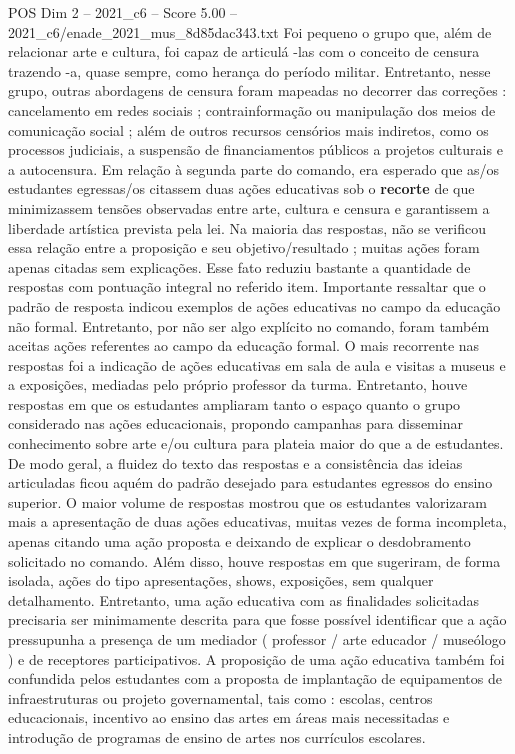 \begin{textsample}{POS Dim 2 – 2021\_c6 – Score 5.00 – 2021\_c6/enade\_2021\_mus\_8d85dac343.txt}
Foi pequeno o grupo que, além de relacionar arte e cultura, foi capaz de articulá -las com o conceito de censura trazendo -a, quase sempre, como herança do período militar.
Entretanto, nesse grupo, outras abordagens de censura foram mapeadas no decorrer das correções : cancelamento em redes sociais ; contrainformação ou manipulação dos meios de comunicação social ; além de outros recursos censórios mais indiretos, como os processos judiciais, a suspensão de financiamentos públicos a projetos culturais e a autocensura.
Em relação à segunda parte do comando, era esperado que as/os estudantes egressas/os citassem duas ações educativas sob o \textbf{recorte} de que minimizassem tensões observadas entre arte, cultura e censura e garantissem a liberdade artística prevista pela lei.
Na maioria das respostas, não se verificou essa relação entre a proposição e seu objetivo/resultado ; muitas ações foram apenas citadas sem explicações.
Esse fato reduziu bastante a quantidade de respostas com pontuação integral no referido item.
Importante ressaltar que o padrão de resposta indicou exemplos de ações educativas no campo da educação não formal.
Entretanto, por não ser algo explícito no comando, foram também aceitas ações referentes ao campo da educação formal.
O mais recorrente nas respostas foi a indicação de ações educativas em sala de aula e visitas a museus e a exposições, mediadas pelo próprio professor da turma.
Entretanto, houve respostas em que os estudantes ampliaram tanto o espaço quanto o grupo considerado nas ações educacionais, propondo campanhas para disseminar conhecimento sobre arte e/ou cultura para plateia maior do que a de estudantes.
De modo geral, a fluidez do texto das respostas e a consistência das ideias articuladas ficou aquém do padrão desejado para estudantes egressos do ensino superior.
O maior volume de respostas mostrou que os estudantes valorizaram mais a apresentação de duas ações educativas, muitas vezes de forma incompleta, apenas citando uma ação proposta e deixando de explicar o desdobramento solicitado no comando.
Além disso, houve respostas em que sugeriram, de forma isolada, ações do tipo apresentações, shows, exposições, sem qualquer detalhamento.
Entretanto, uma ação educativa com as finalidades solicitadas precisaria ser minimamente descrita para que fosse possível identificar que a ação pressupunha a presença de um mediador ( professor / arte educador / museólogo ) e de receptores participativos.
A proposição de uma ação educativa também foi confundida pelos estudantes com a proposta de implantação de equipamentos de infraestruturas ou projeto governamental, tais como : escolas, centros educacionais, incentivo ao ensino das artes em áreas mais necessitadas e introdução de programas de ensino de artes nos currículos escolares.

\end{textsample}
